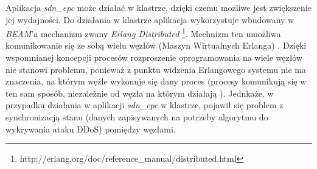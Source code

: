 Aplikacja \textit{sdn\_epc} może działać w klastrze, dzięki czemu możliwe jest
zwiększenie jej wydajności. Do działania w klastrze aplikacja wykorzystuje
wbudowany w \textit{BEAM}'a mechanizm zwany \textit{Erlang Distributed}
\footnote{http://erlang.org/doc/reference\_manual/distributed.html}. Mechnizm
ten umożliwa komunikowanie się ze sobą wielu węzłów (Maszyn Wirtualnych
Erlanga) \cite{erldocs}. Dzięki wspomnianej koncepcji procesów rozproszenie
oprogramowania na wiele węzłów nie stanowi problemu, ponieważ z punktu widzenia
Erlangowego systemu nie ma znaczenia, na którym węźle wykonuje się dany proces
(procesy komunikują się w ten sam sposób, niezależnie od węzła na którym
działają \cite{erldocs}). Jednkaże, w przypadku działania w aplikacji
\textit{sdn\_epc} w klastrze, pojawił się problem z synchronizacją stanu (danych
zapisywanych na potrzeby algorytmu do wykrywania ataku DDoS) pomiędzy węzłami.

